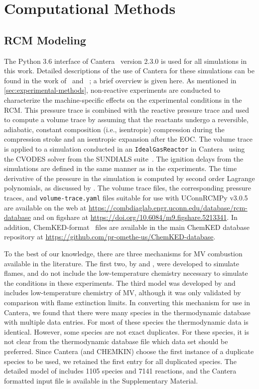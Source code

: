 \documentclass[letterpaper, review, sort&compress]{elsarticle}
\begin{document}
\section{Computational Methods}\label{sec:computational-methods}
\subsection{RCM Modeling}\label{sec:experimental-modeling}

The Python 3.6 interface of Cantera~\cite{cantera} version 2.3.0 is used for all simulations in this
work. Detailed descriptions of the use of Cantera for these simulations can be found in the work
of~\citet{Weber2016a} and~ \citet{Dames2016}; a brief overview is given here. As mentioned in
\cref{sec:experimental-methods}, non-reactive experiments are conducted to characterize the
machine-specific effects on the experimental conditions in the RCM. This pressure trace is combined
with the reactive pressure trace and used to compute a volume trace by assuming that the reactants
undergo a reversible, adiabatic, constant composition (i.e., isentropic) compression during the
compression stroke and an isentropic expansion after the EOC. The volume trace is applied to a
simulation conducted in an \verb|IdealGasReactor| in Cantera~\cite{cantera} using the CVODES solver
from the SUNDIALS suite~\cite{Hindmarsh2005}. The ignition delays from the simulations are defined
in the same manner as in the experiments. The time derivative of the pressure in the simulation is
computed by second order Lagrange polynomials, as discussed by \citet{Chapra2010}. The volume trace
files, the corresponding pressure traces, and \texttt{volume-trace.yaml} files suitable for use with
UConnRCMPy v3.0.5~\cite{uconnrcmpy} are available on the web at
\url{https://combdiaglab.engr.uconn.edu/database/rcm-database} and on figshare at
\url{https://doi.org/10.6084/m9.figshare.5213341}. In addition, ChemKED-format~\cite{Weber2017}
files are available in the main ChemKED database repository at
\url{https://github.com/pr-omethe-us/ChemKED-database}.


To the best of our knowledge, there are three mechanisms for MV combustion available in the
literature. The first two, by \citet{Korobeinichev2015} and \citet{Dmitriev2015}, were developed to
simulate flames, and do not include the low-temperature chemistry necessary to simulate the
conditions in these experiments. The third model was developed by \citet{Dievart2013} and includes
low-temperature chemistry of MV, although it was only validated by comparison with flame extinction
limits. In converting this mechanism for use in Cantera, we found that there were many species in
the thermodynamic database with multiple data entries. For most of these species the thermodynamic
data is identical. However, some species are not exact duplicates. For these species, it is not
clear from the thermodynamic database file which data set should be preferred. Since Cantera (and
CHEMKIN) choose the first instance of a duplicate species to be used, we retained the first entry
for all duplicated species. The detailed model of \citet{Dievart2013} includes 1105 species and 7141
reactions, and the Cantera formatted input file is available in the Supplementary Material.
\end{document}
